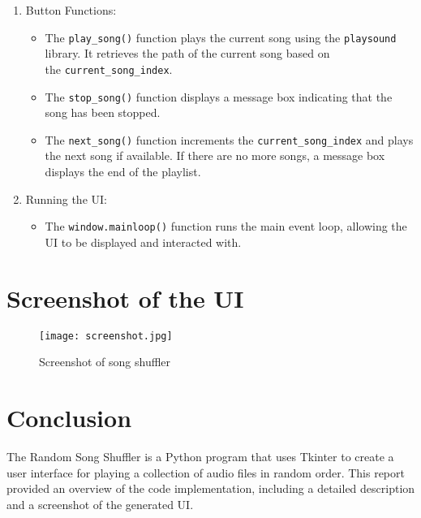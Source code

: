 \documentclass{article}
\begin{document}
\begin{enumerate}
  \item Button Functions:
    \begin{itemize}
    \item The \texttt{play\_song()} function plays the current song using the \texttt{playsound} library. It retrieves the path of the current song based on \\
      the \texttt{current\_song\_index}.
            \item The \texttt{stop\_song()} function displays a message box indicating that the song has been stopped.
      \item The \texttt{next\_song()} function increments the \texttt{current\_song\_index} and plays the next song if available. If there are no more songs, a message box displays the end of the playlist.
    \end{itemize}
  
  \item Running the UI:
    \begin{itemize}
      \item The \texttt{window.mainloop()} function runs the main event loop, allowing the UI to be displayed and interacted with.
    \end{itemize}
\end{enumerate}

\section{Screenshot of the UI}
\begin{figure}[htbp]
  \centering
  \texttt{[image: screenshot.jpg]}
  \caption{Screenshot of song shuffler}
\end{figure}

\section{Conclusion}
The Random Song Shuffler is a Python program that uses Tkinter to create a user interface for playing a collection of audio files in random order. This report provided an overview of the code implementation, including a detailed description and a screenshot of the generated UI.
\end{document}
